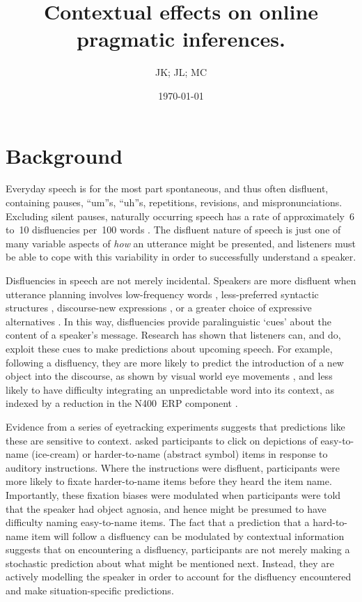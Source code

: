 \documentclass[a4paper,man,natbib]{apa6}
\title{Contextual effects on online pragmatic inferences.}
\author{JK; JL; MC}
\date{\today}
\newcommand*{\spex}[1]{``{#1}''} %
\begin{document}
\maketitle


\section{Background}
Everyday speech is for the most part spontaneous, and thus often disfluent, containing pauses, \spex{um}s, \spex{uh}s, repetitions, revisions, and mispronunciations.
Excluding silent pauses, naturally occurring speech has a rate of approximately~6 to~10 disfluencies per~100 words \citep{Bortfeld2001,FoxTree1995}.
The disfluent nature of speech is just one of many variable aspects of \emph{how} an utterance might be presented, and listeners must be able to cope with this variability in order to successfully understand a speaker.

Disfluencies in speech are not merely incidental.  Speakers are more disfluent when utterance planning involves low-frequency words \citep{Beattie1979}, less-preferred syntactic structures \citep{Cook2009}, discourse-new expressions \citep{arnold2000heaviness}, or a greater choice of expressive alternatives \citep{Schachter1991}.
In this way, disfluencies provide paralinguistic `cues' about the content of a speaker's message.
Research has shown that listeners can, and do, exploit these cues to make predictions about upcoming speech.
For example, following a disfluency, they are more likely to predict the introduction of a new object into the discourse, as shown by visual world eye movements \citep{Arnold2004}, and less likely to have difficulty integrating an unpredictable word into its context, as indexed by a reduction in the N400~ERP component \citep{Corley2007}.

Evidence from a series of eyetracking experiments suggests that predictions like these are sensitive to context.
\citet{Arnold2007} asked participants to click on depictions of easy-to-name (ice-cream) or harder-to-name (abstract symbol) items in response to auditory instructions.
Where the instructions were disfluent, participants were more likely to fixate harder-to-name items before they heard the item name.
Importantly, these fixation biases were modulated when participants were told that the speaker had object agnosia, and hence might be presumed to have difficulty naming easy-to-name items.
The fact that a prediction that a hard-to-name item will follow a disfluency can be modulated by contextual information suggests that on encountering a disfluency, participants are not merely making a stochastic prediction about what might be mentioned next.
Instead, they are actively modelling the speaker in order to account for the disfluency encountered and make situation-specific predictions.
\end{document}
